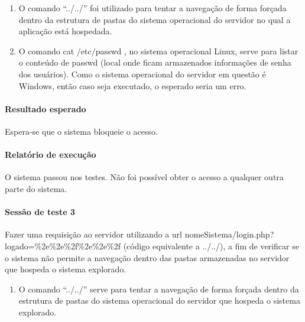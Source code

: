 \documentclass[
    12pt,               %
    openright,          %
    oneside,            %
    a4paper,            %
    section=TITLE,     %
    english,            %
    french,             %
    spanish,            %
    brazil              %
    ]{abntex2}
\begin{document}
\begin{enumerate}[start=1]
	
\item 
	O comando \textquotedblleft{}../../\textquotedblright{} foi utilizado para tentar a navegação de forma forçada dentro da estrutura de pastas do sistema operacional do servidor no qual a aplicação está hospedada.

	
	
\item 
	O comando cat /etc/passwd , no sistema operacional Linux, serve para listar o conteúdo de passwd (local onde ficam armazenados informações de senha dos usuários). Como o sistema operacional do servidor em questão é Windows, então caso seja executado, o esperado seria um erro.

	

\end{enumerate}


\paragraph*{Resultado esperado}

Espera-se que o sistema bloqueie o acesso.



\paragraph*{Relatório de execução}

O sistema passou nos testes. Não foi possível obter o acesso a qualquer outra parte do sistema.



\paragraph*{Sessão de teste 3}

Fazer uma requisição ao servidor utilizando a url nomeSistema/login.php?logado=\%2e\%2e\%2f\%2e\%2e\%2f (código equivalente a ../../), a fim de verificar se o sistema não permite a navegação dentro das pastas armazenadas no servidor que hospeda o sistema explorado.



\begin{enumerate}[start=1]
	
\item 
	O comando \textquotedblleft{}../../\textquotedblright{} serve para tentar a navegação de forma forçada dentro da estrutura de pastas do sistema operacional do servidor que hospeda o sistema explorado.

	

\end{enumerate}
\end{document}
